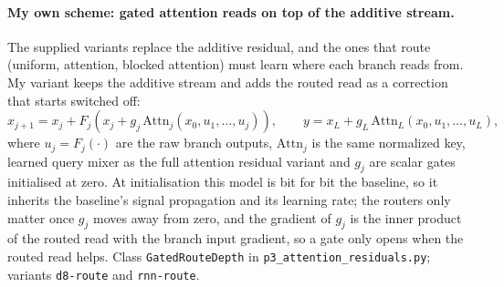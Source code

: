 \paragraph{My own scheme: gated attention reads on top of the additive stream.}
The supplied variants replace the additive residual, and the ones that route (uniform, attention, blocked attention) must learn where each branch reads from. My variant keeps the additive stream and adds the routed read as a correction that starts switched off:
\[
x_{j+1} = x_j + F_j\!\left(x_j + g_j\,\mathrm{Attn}_j(x_0, u_1, \dots, u_j)\right), \qquad y = x_L + g_L\,\mathrm{Attn}_L(x_0, u_1, \dots, u_L),
\]
where $u_j = F_j(\cdot)$ are the raw branch outputs, $\mathrm{Attn}_j$ is the same normalized key, learned query mixer as the full attention residual variant and $g_j$ are scalar gates initialised at zero. At initialisation this model is bit for bit the baseline, so it inherits the baseline's signal propagation and its learning rate; the routers only matter once $g_j$ moves away from zero, and the gradient of $g_j$ is the inner product of the routed read with the branch input gradient, so a gate only opens when the routed read helps. Class \texttt{GatedRouteDepth} in \texttt{p3\_attention\_residuals.py}; variants \texttt{d8-route} and \texttt{rnn-route}.
